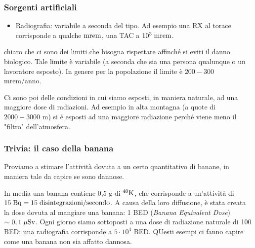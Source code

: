 \subsubsection{Sorgenti artificiali}

\begin{itemize}
    \item Radiografia: variabile a seconda del tipo. Ad esempio una RX al torace corrisponde a qualche $\rm mrem$, una TAC a $10^3 \; \rm mrem$.
\end{itemize}

\E chiaro che ci sono dei limiti che bisogna rispettare affinché si eviti il danno biologico. Tale limite è variabile (a seconda che sia una persona qualunque o un lavoratore esposto). In genere per la popolazione il limite è $200 - 300$ mrem/anno.

Ci sono poi delle condizioni in cui siamo esposti, in maniera naturale, ad una maggiore dose di radiazioni. Ad esempio in alta montagna (a quote di $2000-3000$ m) si è esposti ad una maggiore radiazione perché viene meno il "filtro" dell'atmosfera.

\subsubsection{Trivia: il caso della banana}

Proviamo a stimare l'attività dovuta a un certo quantitativo di banane, in maniera tale da capire se sono dannose.

In media una banana contiene 0,5 g di $\rm ^{40}K$, che corrisponde a un'attività di $\rm 15 \; Bq=15 \; disintegrazioni/secondo$. A causa della loro diffusione, è stata creata la dose dovuta al mangiare una banana: 1 BED (\textit{Banana Equivalent Dose}) $\sim 0,1 \; \rm \mu Sv$. Ogni giorno siamo sottoposti a una dose di radiazione naturale di 100 BED; una radiografia corrisponde a $5 \cdot 10^4$ BED. QUesti esempi ci fanno capire come una banana non sia affatto dannosa.